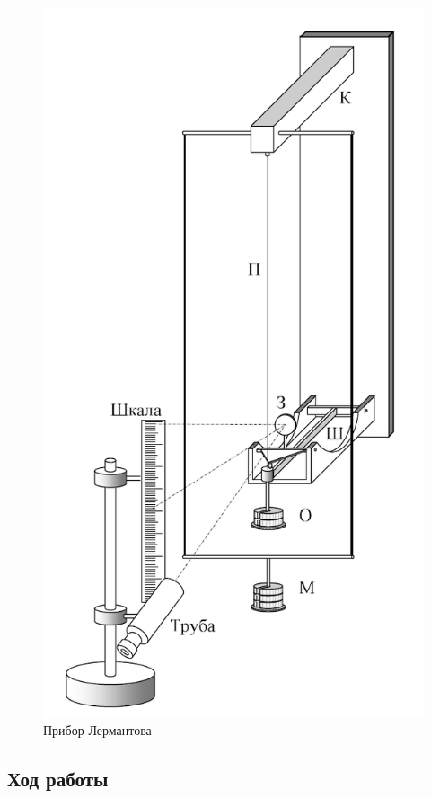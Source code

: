 \documentclass[a4paper]{article}
\begin{document}
\begin{figure}[!ht]
    \centering
    \includegraphics[scale=0.4]{lermantov.png}
    \caption{Прибор Лермантова}
\end{figure}

\newpage
\subsection{Ход работы}
\end{document}
